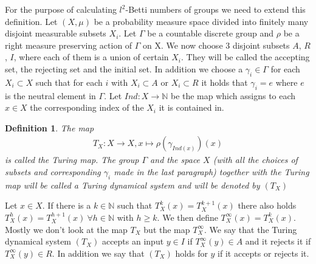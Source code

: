 \documentclass[12pt,a4paper]{scrartcl}
\newtheorem{Definition}[Theorem]{Definition}
\numberwithin{equation}{section}
\newcommand{\N}{\mathbb{N}} %
\newcommand{\2}{\mathbb{Z} / 2 \mathbb{Z}}
\newcommand{\1}{\bar{1}}
\newcommand{\0}{\bar{0}}
\begin{document}
For the purpose of calculating $l^2$-Betti numbers of groups we need to extend this definition. Let $(X, \mu)$ be a probability measure space divided into finitely many disjoint measurable subsets $X_i$. Let $\Gamma$ be a countable discrete group and $\rho$ be a right measure preserving action of $\Gamma$ on X.
We now choose 3 disjoint subsets $A$, $R$, $I$, where each of them is a union of certain $X_i$. They will be called the accepting set, the rejecting set and the initial set. In addition we choose a $\gamma_i \in \Gamma$ for each $X_i \subset X$ such that for each $i$ with $X_i \subset A$ or $X_i \subset R$ it holds that $\gamma_i = e$ where $e$ is the neutral element in $\Gamma$. 
Let $Ind: X \to \N$ be the map which assigns to each $x \in X$ the corresponding index of the $X_i$ it is contained in.
\begin{Definition}
	 The map 
	 \begin{align*}
	 T_X:X \to X, x \mapsto \rho(\gamma_{Ind(x)})(x)
	 \end{align*}
	 is called the Turing map.
	 The group $\Gamma$ and the space $X$ (with all the choices of subsets and corresponding $\gamma_i$ made in the last paragraph) together with the Turing map will be called a Turing dynamical system and will be denoted by $(T_X)$
\end{Definition}
Let $x \in X$. If there is a $k \in \N$ such that $T_X^k(x) = T_X^{k + 1}(x)$ there also holds $T_X^h(x) = T_X^{h + 1}(x) \ \forall h \in \N$ with $h \geq k$. We then define $T_X^\infty (x) = T_X^k(x)$. Mostly we don't look at the map $T_X$ but the map $T_X^\infty$. We say that the Turing dynamical system $(T_X)$ accepts an input $y \in I$ if $T_X^\infty(y) \in A$ and it rejects it if $T_X^\infty(y) \in R$. In addition we say that $(T_X)$ holds for $y$ if it accepts or rejects it.
\end{document}
